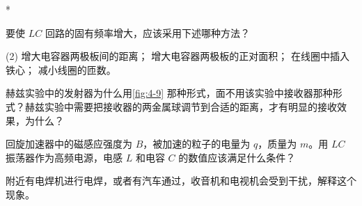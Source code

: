 \begin{Exercise}*
\begin{question}
	\item 要使 $LC$ 回路的固有频率增大，应该采用下述哪种方法？
	\begin{tasks}(2)
		\task 增大电容器两极板间的距离；
		\task 增大电容器两极板的正对面积；
		\task 在线圈中插入铁心；
		\task 减小线圈的匝数。
	\end{tasks}
	\item 赫兹实验中的发射器为什么用\cref{fig:4-9} 那种形式，面不用该实验中接收器那种形式？赫兹实验中需要把接收器的两金属球调节到合适的距离，才有明显的接收效果，为什么？
	\item 回旋加速器中的磁感应强度为 $B$，被加速的粒子的电量为 $q$，质量为 $m$。用 $LC$ 振荡器作为高频电源，电感 $L$ 和电容 $C$ 的数值应该满足什么条件？
	\item 附近有电焊机进行电焊，或者有汽车通过，收音机和电视机会受到干扰，解释这个现象。
\end{question}
\end{Exercise}
